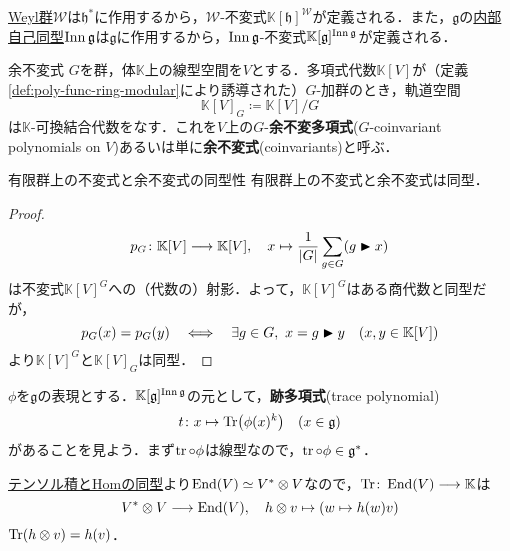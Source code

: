 \documentclass[rep_main]{subfiles}
\begin{document}
\hyperref[def:Weylgroup]{Weyl群}$\mathscr{W}$は$\mathfrak{h}^*$に作用するから，$\mathscr{W}$-不変式$\mathbb{K}[\mathfrak{h}]^\mathscr{W}$が定義される．また，$\mathfrak{g}$の\hyperref[def:inner-LieAlg]{内部自己同型}$\operatorname{Inn}\mathfrak{g}$は$\mathfrak{g}$に作用するから，$\operatorname{Inn}\mathfrak{g}$-不変式$\mathbb{K}[\mathfrak{g}]^{\operatorname{Inn}\mathfrak{g}}$が定義される．
\begin{mydef}[label=def:coinvariant-polynomial]{余不変式}
	$G$を群，体$\mathbb{K}$上の線型空間を$V$とする．多項式代数$\mathbb{K}[V]$が（定義\ref{def:poly-func-ring-modular}により誘導された）$G$-加群のとき，軌道空間
	\begin{equation}
		\mathbb{K}[V]_G \coloneqq \mathbb{K}[V] / G
	\end{equation}
	は$\mathbb{K}$-可換結合代数をなす．これを$V$上の$G$-\textbf{余不変多項式}($G$-coinvariant polynomials on $V$)あるいは単に\textbf{余不変式}(coinvariants)と呼ぶ．
\end{mydef}
\begin{mytheo}[label=def:coinv-inv-isomorphism]{有限群上の不変式と余不変式の同型性}
	有限群上の不変式と余不変式は同型．
\end{mytheo}
\begin{proof}
	\begin{equation}
		p_G \colon \mathbb{K}[V] \longrightarrow \mathbb{K}[V],\quad  x \mapsto \frac{1}{|G|}\sum_{g \in G} (g \blacktriangleright x)
	\end{equation}
	は不変式$\mathbb{K}[V]^G$への（代数の）射影．よって，$\mathbb{K}[V]^G$はある商代数と同型だが，
	\begin{equation}
		p_G(x) = p_G(y)  \quad \Longleftrightarrow \quad  \exists g \in G,\ x = g \blacktriangleright y\quad  (x, y \in \mathbb{K}[V])
	\end{equation}
	より$\mathbb{K}[V]^G$と$\mathbb{K}[V]_G$は同型．
\end{proof}
$\phi$を$\mathfrak{g}$の表現とする．$\mathbb{K}[\mathfrak{g}]^{\operatorname{Inn}\mathfrak{g}}$の元として，\textbf{跡多項式}(trace polynomial)
\begin{equation}
	t\colon x \mapsto \Tr(\phi(x)^k)\quad  (x \in \mathfrak{g})
\end{equation}
があることを見よう．まず$\tr \circ \phi$は線型なので，$\tr \circ \phi \in \mathfrak{g}^*$．

\hyperref[]{テンソル積とHomの同型}より$\operatorname{End}(V) \simeq V^* \otimes V$なので，$\Tr \colon \operatorname{End}(V) \longrightarrow \mathbb{K}$は
\begin{equation}
	V^* \otimes V \longrightarrow \operatorname{End}(V),\quad  h \otimes v \mapsto (w \mapsto h(w)v)
\end{equation}
$\Tr(h \otimes v) = h(v)$．
\end{document}
